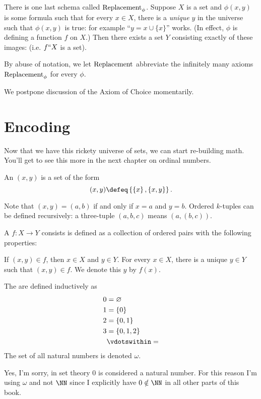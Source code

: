 There is one last schema called $\mathrm{Replacement}_\phi$.
Suppose $X$ is a set and $\phi(x,y)$ is some formula
such that for every $x \in X$, there is a \emph{unique} $y$ in the universe
such that $\phi(x,y)$ is true: for example ``$y = x \cup \{x\}$'' works.
(In effect, $\phi$ is defining a function $f$ on $X$.)
Then there exists a set $Y$ consisting exactly of these images:
(i.e. $f``X$ is a set).
\begin{abuse}
	By abuse of notation, we let $\mathrm{Replacement}$ abbreviate
	the infinitely many axioms $\mathrm{Replacement}_\phi$ for every $\phi$.
\end{abuse}

We postpone discussion of the Axiom of Choice momentarily.

\section{Encoding}
Now that we have this rickety universe of sets, we can start re-building math.
You'll get to see this more in the next chapter on ordinal numbers.

\begin{definition}
	An  $(x,y)$
	is a set of the form
	\[ (x,y) \defeq 
		\left\{ \left\{ x \right\}, \left\{ x,y \right\} \right\}. \]
\end{definition}
Note that $(x,y) = (a,b)$ if and only if $x=a$ and $y=b$.
Ordered $k$-tuples can be defined recursively: a three-tuple $(a,b,c)$ means $(a,(b,c))$.

\begin{definition}
	A  $f : X \to Y$ 
	consists is defined as a collection of ordered pairs
	with the following properties:
	\begin{itemize}
		\ii If $(x,y) \in f$, then $x \in X$ and $y \in Y$.
		\ii For every $x \in X$, there is a unique $y \in Y$
		such that $(x,y) \in f$. We denote this $y$ by $f(x)$.
	\end{itemize}
\end{definition}

\begin{definition}
	The  are defined inductively as
	\begin{align*}
		0 &= \varnothing \\
		1 &= \{0\} \\
		2 &= \{0,1\} \\
		3 &= \{0,1,2\} \\
		&\vdotswithin=
	\end{align*}
	The set of all natural numbers is denoted $\omega$.
\end{definition}
\begin{abuse}
	Yes, I'm sorry, in set theory $0$ is considered a natural number.
	For this reason I'm using $\omega$ and not $\NN$
	since I explicitly have $0\notin\NN$ in all other parts of this book.
\end{abuse}

